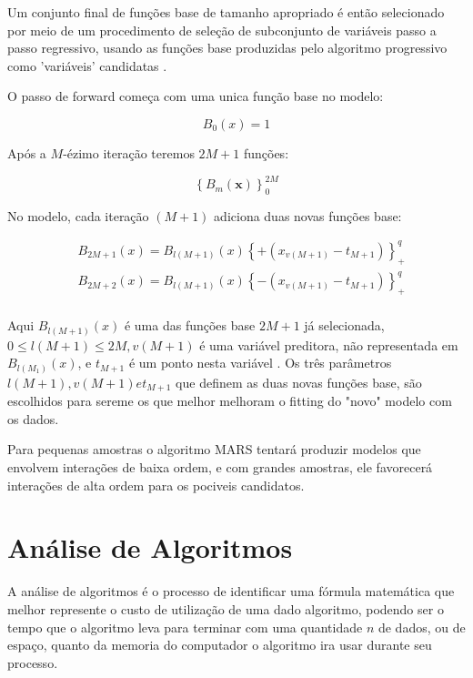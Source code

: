 \documentclass[
	12pt,				%
	openright,			%
	oneside,			%
	a4paper,			%
	english,			%
	brazil				%
	]{abntex2}
\begin{document}
Um conjunto final de funções base de tamanho apropriado é então selecionado por meio de um procedimento de seleção de subconjunto de 
variáveis passo a passo regressivo, usando as funções base produzidas pelo algoritmo progressivo como 'variáveis' 
candidatas \cite{intro_mars}.

O passo de forward começa com uma unica função base no modelo:

\begin{equation}
	\label{inicio_funcao_base}
	B_0(x) = 1
\end{equation}

Após a $M$-ézimo iteração teremos $2M+1$ funções:

\begin{equation}
	\label{funcao_base}
	\left\{B_m(\mathbf{x})\right\}_{0}^{2M}
\end{equation}

No modelo, cada iteração $(M + 1)$ adiciona duas novas funções base:

\begin{equation}
	\label{novas_funcoes}
	\begin{split}
		& B_{2M+1}(x) = B_{l(M+1)}(x)\left\{+(x_{v(M+1)}-t_{M+1})\right\}_{+}^{q} \\
		& B_{2M+2}(x) = B_{l(M+1)}(x)\left\{-(x_{v(M+1)}-t_{M+1})\right\}_{+}^{q} \\
	\end{split}
\end{equation}

Aqui $B_{l(M+1)}(x)$ é uma das funções base $2M + 1$ já selecionada, $0 \leq l(M+1) \leq 2M, v(M+1)$ é uma variável preditora, não
representada em $B_{l(M_1)}(x)$, e $t_{M+1}$ é um ponto nesta variável . Os três parâmetros $l(M+1), v(M+1) e t_{M+1}$ que definem as
duas novas funções base, são escolhidos para sereme os que melhor melhoram o fitting do "novo" modelo com os dados.

Para pequenas amostras o algoritmo MARS tentará produzir modelos que envolvem interações de baixa ordem, e com grandes amostras, 
ele favorecerá interações de alta ordem para os pociveis candidatos.

\section{Análise de Algoritmos}

A análise de algoritmos é o processo de identificar uma fórmula matemática que melhor represente o custo de
utilização de uma dado algoritmo, podendo ser o tempo que o algoritmo leva para terminar com uma quantidade $n$
de dados, ou de espaço, quanto da memoria do computador o algoritmo ira usar durante seu processo.
\end{document}
